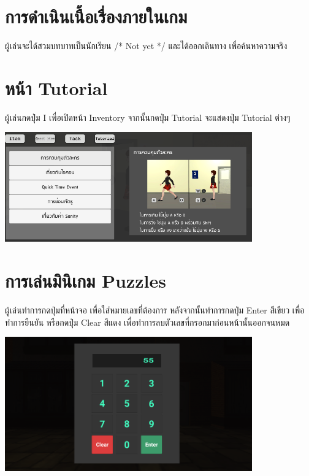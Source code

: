 \section*{การดำเนินเนื้อเรื่องภายในเกม}
ผู้เล่นจะได้สวมบทบาทเป็นนักเรียน /* Not yet */ และได้ออกเดินทาง
เพื่อค้นหาความจริง

\section*{หน้า Tutorial}
ผู้เล่นกดปุ่ม I เพื่อเปิดหน้า Inventory จากนั้นกดปุ่ม Tutorial จะแสดงปุ่ม Tutorial ต่างๆ
\begin{center}
    \includegraphics[width=0.8\textwidth, height=0.25\textheight]{Images/Tutorial Image.png}
\end{center}

\section*{การเล่นมินิเกม Puzzles}
ผู้เล่นทำการกดปุ่มที่หน้าจอ เพื่อใส่หมายเลขที่ต้องการ หลังจากนั้นทำการกดปุ่ม Enter สีเขียว เพื่อทำการยืนยัน หรือกดปุ่ม Clear สีแดง เพื่อทำการลบตัวเลขที่กรอกมาก่อนหน้านั้นออกจนหมด
\begin{center}
    \includegraphics[width=0.8\textwidth, height=0.25\textheight]{Images/Insert Puzzles.png}
\end{center}

